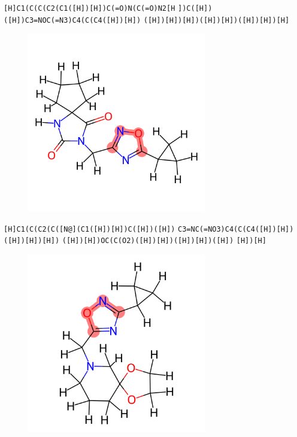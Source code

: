 \documentclass{beamer}
\begin{document}
\begin{frame}[fragile]
\verb|[H]C1(C(C(C2(C1([H])[H])C(=O)N(C(=O)N2[H|
\verb|])C([H])([H])C3=NOC(=N3)C4(C(C4([H])[H])|
\verb|([H])[H])[H])([H])[H])([H])[H])[H]|

\begin{figure}
    \includegraphics[width=0.7\textwidth,height=0.7\textheight,keepaspectratio]{mol04.png}
\end{figure}
\end{frame}
\begin{frame}[fragile]
\verb|[H]C1(C(C2(C([N@](C1([H])[H])C([H])([H])|
\verb|C3=NC(=NO3)C4(C(C4([H])[H])([H])[H])[H])|
\verb|([H])[H])OC(C(O2)([H])[H])([H])[H])([H])|
\verb|[H])[H]|

\begin{figure}
    \includegraphics[width=0.7\textwidth,height=0.7\textheight,keepaspectratio]{mol05.png}
\end{figure}
\end{frame}
\end{document}
